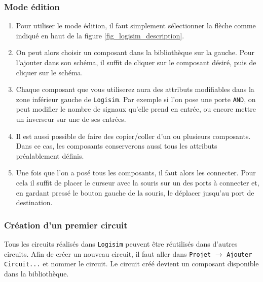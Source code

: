 \documentclass{article}
\begin{document}
    \subsubsection{Mode édition}
    \begin{enumerate}
        \item Pour utiliser le mode édition, il faut simplement sélectionner la flèche comme indiqué en haut de la figure
        \ref{fig_logisim_description}.
        \item On peut alors choisir un composant dans la bibliothèque sur la gauche.
        Pour l'ajouter dans son schéma, il suffit
        de cliquer sur le composant désiré, puis de cliquer sur le schéma.

        \item Chaque composant que vous utiliserez aura des attributs modifiables dans la zone inférieur gauche de
        \texttt{Logisim}.
        Par exemple si l'on pose une porte \texttt{AND}, on peut modifier le nombre de signaux qu'elle prend en
        entrée, ou encore mettre un inverseur sur une de ses entrées.

        \item Il est aussi possible de faire des copier/coller d'un ou plusieurs composants.
        Dans ce cas, les composants
        conserverons aussi tous les attributs préalablement définis.

        \item Une fois que l'on a posé tous les composants, il faut alors les connecter.
        Pour cela il suffit de placer le curseur
        avec la souris sur un des ports à connecter et, en gardant pressé le bouton
        gauche de la souris, le déplacer jusqu'au port de destination.

    \end{enumerate}


    \subsubsection{Création d'un premier circuit}



    \label{nouveauCircuit}
    Tous les circuits réalisés dans \texttt{Logisim} peuvent être réutilisés dans d'autres circuits.
    Afin de créer un nouveau circuit, il faut aller dans \texttt{Projet} $\rightarrow$ \texttt{Ajouter Circuit...} et nommer le circuit.
    Le circuit créé devient un composant disponible dans la bibliothèque.
\end{document}
